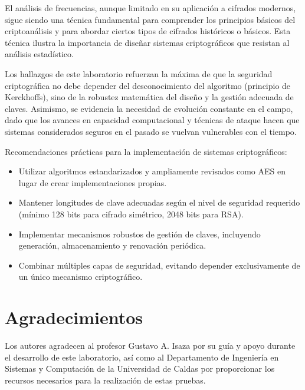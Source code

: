 \documentclass[12pt,a4paper]{article}
\begin{document}
El análisis de frecuencias, aunque limitado en su aplicación a cifrados modernos, sigue siendo una técnica fundamental para comprender los principios básicos del criptoanálisis y para abordar ciertos tipos de cifrados históricos o básicos. Esta técnica ilustra la importancia de diseñar sistemas criptográficos que resistan al análisis estadístico.

Los hallazgos de este laboratorio refuerzan la máxima de que la seguridad criptográfica no debe depender del desconocimiento del algoritmo (principio de Kerckhoffs), sino de la robustez matemática del diseño y la gestión adecuada de claves. Asimismo, se evidencia la necesidad de evolución constante en el campo, dado que los avances en capacidad computacional y técnicas de ataque hacen que sistemas considerados seguros en el pasado se vuelvan vulnerables con el tiempo.

\begin{securitygoodpractice}
	Recomendaciones prácticas para la implementación de sistemas criptográficos:
	\begin{itemize}
		\item Utilizar algoritmos estandarizados y ampliamente revisados como AES en lugar de crear implementaciones propias.
		\item Mantener longitudes de clave adecuadas según el nivel de seguridad requerido (mínimo 128 bits para cifrado simétrico, 2048 bits para RSA).
		\item Implementar mecanismos robustos de gestión de claves, incluyendo generación, almacenamiento y renovación periódica.
		\item Combinar múltiples capas de seguridad, evitando depender exclusivamente de un único mecanismo criptográfico.
	\end{itemize}
\end{securitygoodpractice}

\section*{Agradecimientos}
Los autores agradecen al profesor Gustavo A. Isaza por su guía y apoyo durante el desarrollo de este laboratorio, así como al Departamento de Ingeniería en Sistemas y Computación de la Universidad de Caldas por proporcionar los recursos necesarios para la realización de estas pruebas.
\end{document}
